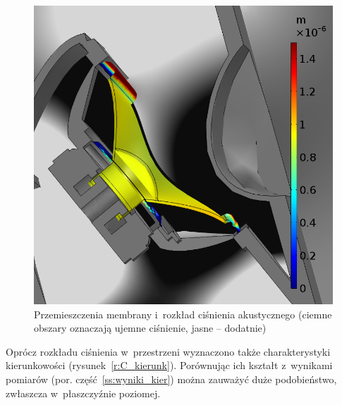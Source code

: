 \documentclass[12pt]{oska}
\begin{document}
		\begin{figure}[!ht]
			\centering
			\includegraphics[width=.55\textwidth]{disp_presure_1kHz.png}
			\caption{Przemieszczenia membrany i~rozkład ciśnienia akustycznego (ciemne obszary oznaczają ujemne ciśnienie, jasne -- dodatnie)}
			\label{r:C_przem_cisn}
		\end{figure}
		
		Oprócz rozkładu ciśnienia w~przestrzeni wyznaczono także charakterystyki kierunkowości (rysunek~\ref{r:C_kierunk}). Porównując ich kształt z~wynikami pomiarów (por. część~\ref{ss:wyniki_kier}) można zauważyć duże podobieństwo, zwłaszcza w~płaszczyźnie poziomej.
		
\end{document}
